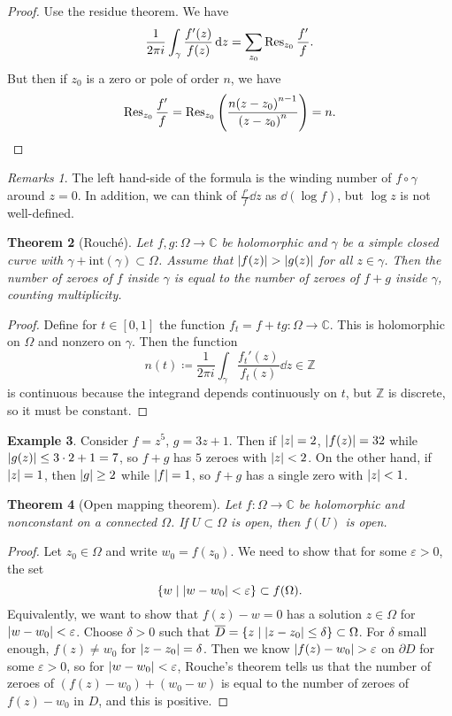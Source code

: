 \documentclass[leqno, openany]{memoir}
\newtheorem{thm}{Theorem}[section]
\theoremstyle{definition}
\newtheorem{exm}[thm]{Example}
\theoremstyle{remark}
\newtheorem{rmks}[thm]{Remarks}
\theoremstyle{plain}
\theoremstyle{definition}
\theoremstyle{remark}
\newcommand{\C}{\mathbb{C}}
\newcommand{\Z}{\mathbb{Z}}
\newcommand{\ep}{\varepsilon}
\newcommand{\mr}[1]{\mathrm{#1}}
\newcommand{\ol}[1]{\overline{#1}}
\begin{document}
\begin{proof}
    Use the residue theorem. We have
    \[ \frac{1}{2 \pi i} \int_{\gamma} \frac{f'(z)}{f(z)} \dd{z} = \sum_{z_0} \Res_{z_0} \frac{f'}{f}. \]
    But then if $z_0$ is a zero or pole of order $n$, we have
    \[ \Res_{z_0} \frac{f'}{f} = \Res_{z_0} \qty(\frac{n{(z-z_0)}^{n-1}}{{(z-z_0)}^n}) = n. \]
\end{proof}

\begin{rmks}
    The left hand-side of the formula is the winding number of $f \circ \gamma$ around $z = 0$. In addition, we can think of $\frac{f'}{f} \dd{z}$ as $\dd{(\log f)}$, but $\log z$ is not well-defined.
\end{rmks}

\begin{thm}[Rouch\'e]
    Let $f, g \colon \Omega \to \C$ be holomorphic and $\gamma$ be a simple closed curve with $\gamma + \mr{int}(\gamma) \subset \Omega$. Assume that $\abs{f(z)} > \abs{g(z)}$ for all $z \in \gamma$. Then the number of zeroes of $f$ inside $\gamma$ is equal to the number of zeroes of $f + g$ inside $\gamma$, counting multiplicity.
\end{thm}

\begin{proof}
    Define for $t \in [0,1]$ the function $f_t = f + tg \colon \Omega \to \C$. This is holomorphic on $\Omega$ and nonzero on $\gamma$. Then the function
    \[ n(t) \coloneqq \frac{1}{2 \pi i} \int_{\gamma} \frac{f_t'(z)}{f_t(z)} \dd{z} \in \Z \]
    is continuous because the integrand depends continuously on $t$, but $\Z$ is discrete, so it must be constant.
\end{proof}

\begin{exm}
    Consider $f = z^5$, $g = 3z + 1$. Then if $\abs{z} = 2$, $\abs{f(z)} = 32$ while $\abs{g(z)} \leq 3 \cdot 2 + 1 = 7$, so $f + g$ has $5$ zeroes with $\abs{z} < 2$. On the other hand, if $\abs{z} = 1$, then $\abs{g} \geq 2$ while $\abs{f} = 1$, so $f + g$ has a single zero with $\abs{z} < 1$.
\end{exm}

\begin{thm}[Open mapping theorem]
    Let $f \colon \Omega \to \C$ be holomorphic and nonconstant on a connected $\Omega$. If $U \subset \Omega$ is open, then $f(U)$ is open.
\end{thm}

\begin{proof}
    Let $z_0 \in \Omega$ and write $w_0 = f(z_0)$. We need to show that for some $\ep > 0$, the set
    \[ \qty{w \mid \abs{w-w_0} < \ep} \subset f(\Omega). \]
    Equivalently, we want to show that $f(z) - w = 0$ has a solution $z \in \Omega$ for $\abs{w-w_0} < \ep$. Choose $\delta > 0$ such that $\ol{D} = \qty{z \mid \abs{z-z_0} \leq \delta} \subset \Omega$. For $\delta$ small enough, $f(z) \neq w_0$ for $\abs{z-z_0} = \delta$. Then we know $\abs{f(z) - w_0} > \ep$ on $\partial D$ for some $\ep > 0$, so for $\abs{w-w_0} < \ep$, Rouche's theorem tells us that the number of zeroes of $(f(z) - w_0) + (w_0 - w)$ is equal to the number of zeroes of $f(z) - w_0$ in $D$, and this is positive.
\end{proof}
\end{document}
